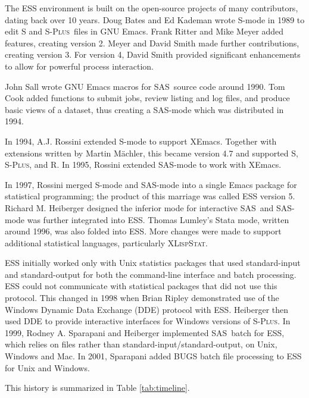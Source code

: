 \documentclass{article}
\newcommand*{\SAS}{\textsc{SAS}}
\newcommand*{\Splus}{\textsc{S-Plus}}
\newcommand*{\XLispStat}{\textsc{XLispStat}}
\begin{document}
The ESS environment is built on the open-source projects of
many contributors, dating back over 10 years.
Doug Bates and Ed Kademan wrote S-mode in 1989 to edit S and \Splus\
files in GNU Emacs.  Frank Ritter and Mike Meyer added features,
creating version 2.  Meyer and David Smith made further contributions,
creating version 3.  For version 4, David Smith provided significant
enhancements to allow for powerful process interaction.

John Sall wrote GNU Emacs macros for \SAS\ source code around 1990.
Tom Cook added functions to submit jobs, review listing and log files,
and produce basic views of a dataset, thus creating a SAS-mode which was
distributed in 1994.

In 1994, A.J. Rossini extended S-mode to support XEmacs.  Together
with extensions written by Martin M{\"a}chler, this became version
4.7 and supported S, \Splus, and R.
In 1995, Rossini extended SAS-mode to work with XEmacs.

In 1997, Rossini merged S-mode and SAS-mode into a single Emacs
package for statistical programming; the product of this marriage was
called ESS version 5.  Richard M. Heiberger designed the inferior mode
for interactive \SAS\ and SAS-mode was further integrated into ESS.
Thomas Lumley's Stata mode, written around 1996, was also folded into
ESS.  More changes were made to support additional statistical
languages, particularly \XLispStat.

ESS initially worked only with Unix statistics packages that used
standard-input and standard-output for both the command-line interface
and batch processing.  ESS could not communicate with statistical
packages that did not use this protocol.  This changed in 1998 when
Brian Ripley demonstrated use of the Windows Dynamic Data Exchange
(DDE) protocol with ESS.  Heiberger then used DDE to provide
interactive interfaces for Windows versions of \Splus.  In 1999,
Rodney A. Sparapani and Heiberger implemented \SAS\ batch for ESS, which
relies on files rather than standard-input/standard-output, on Unix,
Windows and Mac.  In 2001, Sparapani added BUGS batch file processing
to ESS for Unix and Windows.

This history is summarized in Table \ref{tab:timeline}.
\end{document}
